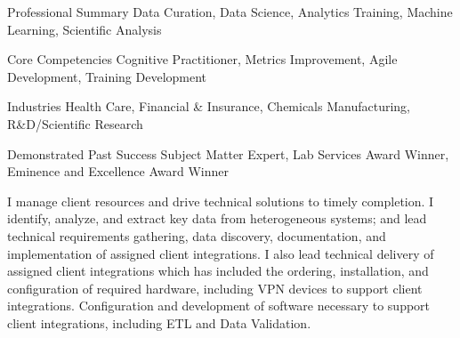 

\begin{cvskills}

  \cvskill
    {Professional Summary} %
    {Data Curation, Data Science, Analytics Training, Machine Learning, Scientific Analysis} %

  \cvskill
    {Core Competencies} %
    {Cognitive Practitioner, Metrics Improvement, Agile Development, Training Development} %

  \cvskill
    {Industries} %
    {Health Care, Financial \& Insurance, Chemicals Manufacturing, R\&D/Scientific Research} %

  \cvskill
    {Demonstrated Past Success} %
    {Subject Matter Expert, Lab Services Award Winner, Eminence and Excellence Award Winner} %

\end{cvskills}

\begin{cvparagraph}
  I manage client resources and drive technical solutions to timely completion.  I identify, analyze, and extract key data from heterogeneous systems; and lead technical requirements gathering, data discovery, documentation, and implementation of assigned client integrations.  I also lead technical delivery of assigned client integrations which has included the ordering, installation, and configuration of required hardware, including VPN devices to support client integrations.  Configuration and development of software necessary to support client integrations, including ETL and Data Validation.
\end{cvparagraph}
    
